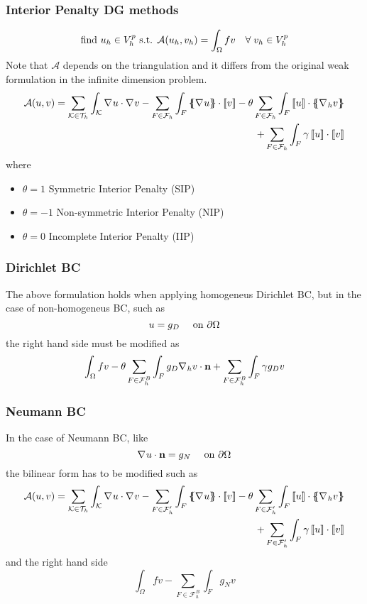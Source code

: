 \subsubsection*{Interior Penalty DG methods}
\[
    \text{find } u_h \in V_h^p \text{ s.t. } \mathcal{A}(u_h, v_h) = \int_\Omega fv \quad \forall \;v_h \in V_h^p
\]
Note that \(\mathcal{A}\) depends on the triangulation and it differs from the original weak formulation in the infinite dimension problem.
\begin{equation*}
    \begin{split}
        \mathcal{A}(u, v) =  \sum_{\element \in \triangulation} \int_\element \grad u \cdot \grad v  - \sum_{F \in \mathcal{F}_h} \int_F \average{\grad u} \cdot \jump{v}  - \theta \sum_{F \in \mathcal{F}_h} \int_F \jump{u} \cdot \average{\grad_h v} \\+ \sum_{F \in \mathcal{F}_h} \int_F \gamma \jump{u} \cdot \jump{v}
    \end{split}
\end{equation*}
where 
\begin{itemize}
    \item \(\theta =  1\) Symmetric Interior Penalty (SIP)
    \item \(\theta =  -1\) Non-symmetric Interior Penalty (NIP)
    \item \(\theta =  0\) Incomplete Interior Penalty (IIP)
\end{itemize}
\subsubsection*{Dirichlet BC}
The above formulation holds when applying homogeneus Dirichlet BC, but in the case of non-homogeneus BC, such as 
\[
    u = g_D \quad \text{ on } \partial\Omega
\]
the right hand side must be modified as
\[
    \int_\Omega fv -\theta \sum_{F \in \mathcal{F}^B_h}\int_F g_D \nabla\mspace{1mu}_h v \cdot \textbf{n} + \sum_{F \in \mathcal{F}^B_h} \int_F \gamma g_D v 
\]
\subsubsection*{Neumann BC}
In the case of Neumann BC, like 
\[
    \nabla\mspace{1mu} u \cdot \textbf{n} = g_N \quad \text{ on } \partial\Omega
\]
the bilinear form has to be modified such as 
\begin{equation*}
    \begin{split}
        \mathcal{A}(u, v) =  \sum_{\element \in \triangulation} \int_\element \grad u \cdot \grad v  - \sum_{F \in \mathcal{F}'_h} \int_F \average{\grad u} \cdot \jump{v}  - \theta \sum_{F \in \mathcal{F}'_h} \int_F \jump{u} \cdot \average{\grad_h v} \\+ \sum_{F \in \mathcal{F}'_h} \int_F \gamma \jump{u} \cdot \jump{v}
    \end{split}
\end{equation*}
and the right hand side 
\[
    \int_\Omega fv - \sum_{F \in \mathcal{F}^B_h}\int_F g_N v
\]
